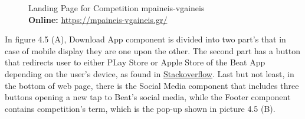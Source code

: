 \begin{figure}[H]
	\centering
	\qquad
	\caption{
		Landing Page for Competition mpaineis-vgaineis
		\\
		\textbf{Online: } \url{https://mpaineis-vgaineis.gr/}
	}
	\label{fig:example}
\end{figure}

In figure 4.5 (A), Download App component is divided into two part's that in case of mobile display they are one upon the other. The second part has a button that redirects user to either PLay Store or Apple Store of the Beat App depending on the user's device, as found in \href{https://l.facebook.com/l.php?u=https\%3A\%2F\%2Fstackoverflow.com\%2Fquestions\%2F38241480\%2Fdetect-macos-ios-windows-android-and-linux-os-with-js\%3Ffbclid\%3DIwAR3uoMdkjVLP4sYZwZYNdWZvnU6ZENl_ydezZUYBDrDXcAuMZ7TKWHR1_rs\&h=AT106TjLH1q4m5FXvHR8F5OLOxARMZ07jIj0a5JeCLWiptBV09H1oPWquvUAykdDj_jEyBSwHwd_ELvKjCUjKGg5FkErIz0jFkG_QK8vfVCOOJfxAjxHPj11YPc4-Jf8JFgCjA}{Stackoverflow}. Last but not least, in the bottom of web page, there is the Social Media component that includes three buttons opening a new tap to Beat's social media, while the Footer component contains competition's term, which is the pop-up shown in picture 4.5 (B). \par

